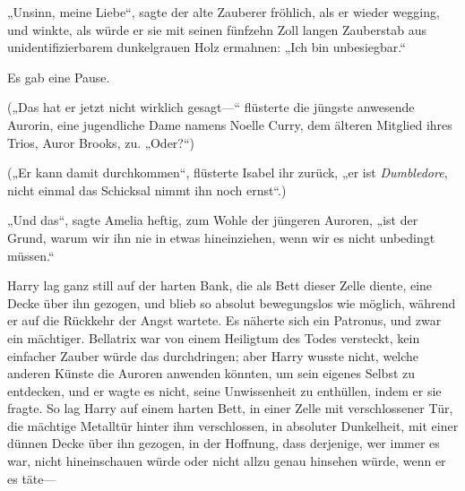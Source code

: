 „Unsinn, meine Liebe“, sagte der alte Zauberer fröhlich, als er wieder wegging, und winkte, als würde er sie mit seinen fünfzehn Zoll langen Zauberstab aus unidentifizierbarem dunkelgrauen Holz ermahnen: „Ich bin unbesiegbar.“

Es gab eine Pause.

(„Das hat er jetzt nicht wirklich gesagt—“ flüsterte die jüngste anwesende Aurorin, eine jugendliche Dame namens Noelle Curry, dem älteren Mitglied ihres Trios, Auror Brooks, zu. „Oder?“)

(„Er kann damit durchkommen“, flüsterte Isabel ihr zurück, „er ist \emph{Dumbledore}, nicht einmal das Schicksal nimmt ihn noch ernst“.)

„Und das“, sagte Amelia heftig, zum Wohle der jüngeren Auroren, „ist der Grund, warum wir ihn nie in etwas hineinziehen, wenn wir es nicht unbedingt müssen.“

\later

Harry lag ganz still auf der harten Bank, die als Bett dieser Zelle diente, eine Decke über ihn gezogen, und blieb so absolut bewegungslos wie möglich, während er auf die Rückkehr der Angst wartete. Es näherte sich ein Patronus, und zwar ein mächtiger. Bellatrix war von einem Heiligtum des Todes versteckt, kein einfacher Zauber würde das durchdringen; aber Harry wusste nicht, welche anderen Künste die Auroren anwenden könnten, um sein eigenes Selbst zu entdecken, und er wagte es nicht, seine Unwissenheit zu enthüllen, indem er sie fragte. So lag Harry auf einem harten Bett, in einer Zelle mit verschlossener Tür, die mächtige Metalltür hinter ihm verschlossen, in absoluter Dunkelheit, mit einer dünnen Decke über ihn gezogen, in der Hoffnung, dass derjenige, wer immer es war, nicht hineinschauen würde oder nicht allzu genau hinsehen würde, wenn er es täte—

